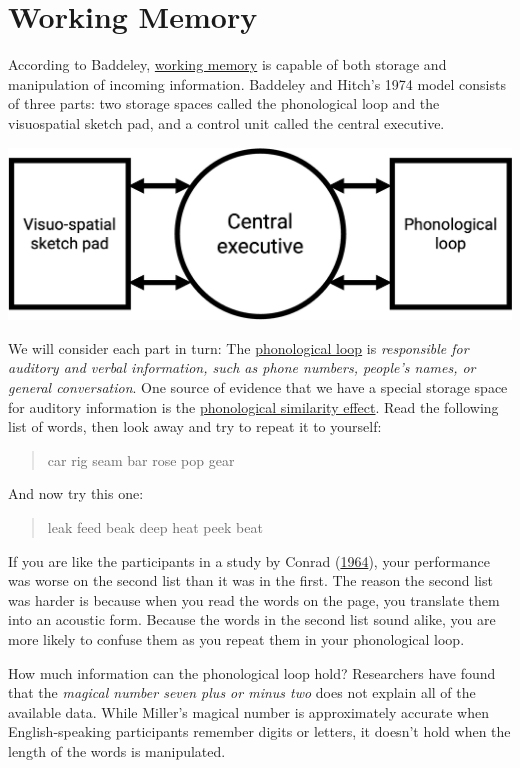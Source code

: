 \documentclass[
]{krantz}
\begin{document}
\hypertarget{working-memory}{%
\section{Working Memory}\label{working-memory}}

According to Baddeley, \protect\hyperlink{working-memory}{working memory} is capable of both storage and manipulation of incoming information. Baddeley and Hitch's 1974 model consists of three parts: two storage spaces called the phonological loop and the visuospatial sketch pad, and a control unit called the central executive.

\begin{center}\includegraphics[width=0.6\linewidth]{images/ch4/fig2} \end{center}

We will consider each part in turn: The \protect\hyperlink{phonological-loop}{phonological loop} is \emph{responsible for auditory and verbal information, such as phone numbers, people's names, or general conversation}. One source of evidence that we have a special storage space for auditory information is the \protect\hyperlink{phonological-similarity-effect}{phonological similarity effect}. Read the following list of words, then look away and try to repeat it to yourself:

\begin{quote}
car rig seam bar rose pop gear
\end{quote}

And now try this one:

\begin{quote}
leak feed beak deep heat peek beat
\end{quote}

If you are like the participants in a study by Conrad (\protect\hyperlink{ref-conrad1964acoustic}{1964}), your performance was worse on the second list than it was in the first. The reason the second list was harder is because when you read the words on the page, you translate them into an acoustic form. Because the words in the second list sound alike, you are more likely to confuse them as you repeat them in your phonological loop.

How much information can the phonological loop hold? Researchers have found that the \emph{magical number seven plus or minus two} does not explain all of the available data. While Miller's magical number is approximately accurate when English-speaking participants remember digits or letters, it doesn't hold when the length of the words is manipulated.
\end{document}
